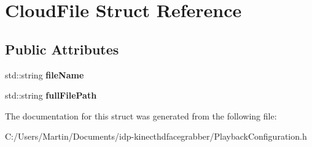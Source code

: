 \hypertarget{struct_cloud_file}{}\section{Cloud\+File Struct Reference}
\label{struct_cloud_file}
\subsection*{Public Attributes}
\begin{DoxyCompactItemize}
\item 
\hypertarget{struct_cloud_file_a51f709d0f6090cdf5f06ce07acf79004}{}std\+::string {\bfseries file\+Name}\label{struct_cloud_file_a51f709d0f6090cdf5f06ce07acf79004}

\item 
\hypertarget{struct_cloud_file_a468763b641372dd60e3cd905fc32bfd3}{}std\+::string {\bfseries full\+File\+Path}\label{struct_cloud_file_a468763b641372dd60e3cd905fc32bfd3}

\end{DoxyCompactItemize}


The documentation for this struct was generated from the following file\+:\begin{DoxyCompactItemize}
\item 
C\+:/\+Users/\+Martin/\+Documents/idp-\/kinecthdfacegrabber/Playback\+Configuration.\+h\end{DoxyCompactItemize}
